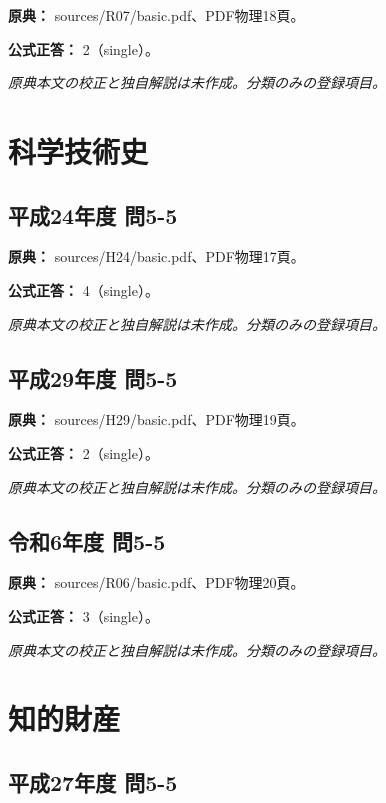 \noindent\textbf{原典：} sources/R07/basic.pdf、PDF物理18頁。

\textbf{公式正答：} 2（single）。

\par\textit{原典本文の校正と独自解説は未作成。分類のみの登録項目。}

\section{科学技術史}

\subsection{平成24年度 問5-5}
\label{q:h24-reg-basic-5-5}

\noindent\textbf{原典：} sources/H24/basic.pdf、PDF物理17頁。

\textbf{公式正答：} 4（single）。

\par\textit{原典本文の校正と独自解説は未作成。分類のみの登録項目。}

\subsection{平成29年度 問5-5}
\label{q:h29-reg-basic-5-5}

\noindent\textbf{原典：} sources/H29/basic.pdf、PDF物理19頁。

\textbf{公式正答：} 2（single）。

\par\textit{原典本文の校正と独自解説は未作成。分類のみの登録項目。}

\subsection{令和6年度 問5-5}
\label{q:r06-reg-basic-5-5}

\noindent\textbf{原典：} sources/R06/basic.pdf、PDF物理20頁。

\textbf{公式正答：} 3（single）。

\par\textit{原典本文の校正と独自解説は未作成。分類のみの登録項目。}

\section{知的財産}

\subsection{平成27年度 問5-5}
\label{q:h27-reg-basic-5-5}

